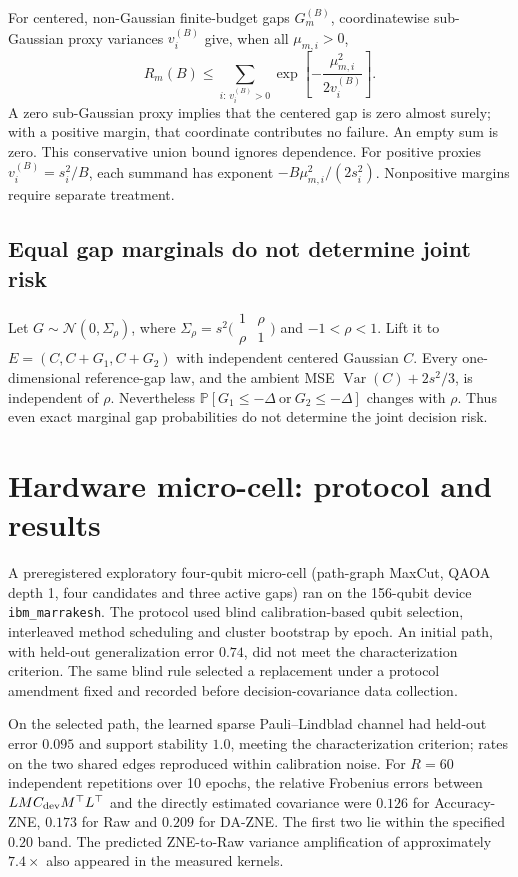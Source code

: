 \documentclass[a4paper,onecolumn,unpublished,nopdfoutputerror]{quantumarticle}
\theoremstyle{plain}
\theoremstyle{definition}
\newcommand{\Prob}{\mathbb{P}}
\newcommand{\Var}{\operatorname{Var}}
\newcommand{\calN}{\mathcal{N}}
\newcommand{\1}{\mathbf{1}}
\begin{document}
For centered, non-Gaussian finite-budget gaps $G_m^{(B)}$, coordinatewise sub-Gaussian proxy variances $v_i^{(B)}$ give, when all $\mu_{m,i}>0$,
\begin{equation}
R_m(B)\le\sum_{i:\,v_i^{(B)}>0}\exp\!\left[-\frac{\mu_{m,i}^2}{2v_i^{(B)}}\right].
\end{equation}
A zero sub-Gaussian proxy implies that the centered gap is zero almost surely; with a positive margin, that coordinate contributes no failure. An empty sum is zero. This conservative union bound ignores dependence. For positive proxies $v_i^{(B)}=s_i^2/B$, each summand has exponent $-B\mu_{m,i}^2/(2s_i^2)$. Nonpositive margins require separate treatment.

\subsection{Equal gap marginals do not determine joint risk}
\label{app:joint_witnesses}

Let $G\sim\calN(0,\Sigma_\rho)$, where $\Sigma_\rho=s^2\bigl(\begin{smallmatrix}1&\rho\\\rho&1\end{smallmatrix}\bigr)$ and $-1<\rho<1$. Lift it to $E=(C,C+G_1,C+G_2)$ with independent centered Gaussian $C$. Every one-dimensional reference-gap law, and the ambient MSE $\Var(C)+2s^2/3$, is independent of $\rho$. Nevertheless $\Prob[G_1\le-\Delta\ \text{or}\ G_2\le-\Delta]$ changes with $\rho$. Thus even exact marginal gap probabilities do not determine the joint decision risk.

\section{Hardware micro-cell: protocol and results}
\label{app:hardware_microcell}

A preregistered exploratory four-qubit micro-cell (path-graph MaxCut, QAOA depth 1, four candidates and three active gaps) ran on the 156-qubit device \texttt{ibm\_marrakesh}. The protocol used blind calibration-based qubit selection, interleaved method scheduling and cluster bootstrap by epoch. An initial path, with held-out generalization error $0.74$, did not meet the characterization criterion. The same blind rule selected a replacement under a protocol amendment fixed and recorded before decision-covariance data collection.

On the selected path, the learned sparse Pauli--Lindblad channel \cite{vandenBerg2023} had held-out error $0.095$ and support stability $1.0$, meeting the characterization criterion; rates on the two shared edges reproduced within calibration noise. For $R=60$ independent repetitions over 10 epochs, the relative Frobenius errors between $LMC_{\rm dev}M^\top L^\top$ and the directly estimated covariance were $0.126$ for Accuracy-ZNE, $0.173$ for Raw and $0.209$ for DA-ZNE. The first two lie within the specified $0.20$ band. The predicted ZNE-to-Raw variance amplification of approximately $7.4\times$ also appeared in the measured kernels.
\end{document}
